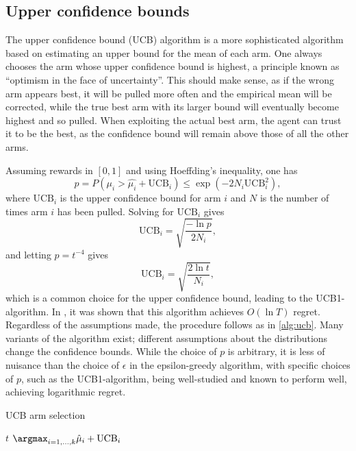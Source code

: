 \subsection{Upper confidence bounds}
The upper confidence bound (UCB) algorithm is a more sophisticated algorithm based on estimating an upper bound for the mean of each arm.
One always chooses the arm whose upper confidence bound is highest, a principle known as \enquote{optimism in the face of uncertainty}.
This should make sense, as if the wrong arm appears best, it will be pulled more often and the empirical mean will be corrected, while the true best arm with its larger bound will eventually become highest and so pulled.
When exploiting the actual best arm, the agent can trust it to be the best, as the confidence bound will remain above those of all the other arms.

Assuming rewards in $[0,1]$ and using Hoeffding's inequality, one has
\begin{equation}
    p
    = P \left(\mu_i > \hat{\mu_i} + \text{UCB}_i \right)
    \leq \exp \left(-2N_i \text{UCB}_i^2 \right),
\end{equation}
where $\text{UCB}_i$ is the upper confidence bound for arm $i$ and $N$ is the number of times arm $i$ has been pulled.
Solving for $\text{UCB}_i$ gives
\begin{equation}
    \text{UCB}_i = \sqrt{\frac{-\ln p}{2N_i}},
\end{equation}
and letting $p = t^{-4}$ gives
\begin{equation}
    \text{UCB}_i = \sqrt{\frac{2 \ln t}{N_i}},
\end{equation}
which is a common choice for the upper confidence bound, leading to the UCB1-algorithm.
In \cite{auer2002}, it was shown that this algorithm achieves $O(\ln T)$ regret.
Regardless of the assumptions made, the procedure follows as in \cref{alg:ucb}.
Many variants of the algorithm exist; different assumptions about the distributions change the confidence bounds.
While the choice of $p$ is arbitrary, it is less of nuisance than the choice of $\epsilon$ in the epsilon-greedy algorithm, with specific choices of $p$, such as the UCB1-algorithm, being well-studied and known to perform well, achieving logarithmic regret.

\begin{algorithm}
    \caption{UCB arm selection}
    \label{alg:ucb}
    \begin{algorithmic}
        \State \Return $t$
        \Else
        \State \Return $\argmax_{i=1,\dots,k} \hat{\mu}_i + \text{UCB}_i$
        \EndIf
    \end{algorithmic}
\end{algorithm}




